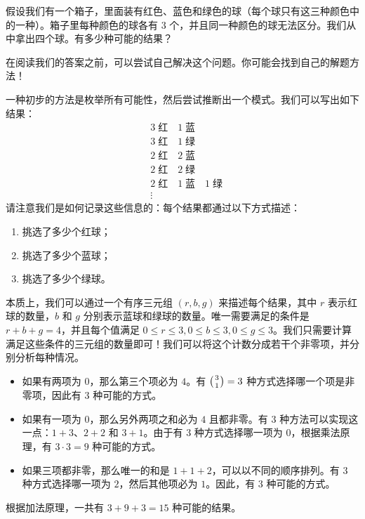 \begin{example}
    假设我们有一个箱子，里面装有红色、蓝色和绿色的球（每个球只有这三种颜色中的一种）。箱子里每种颜色的球各有 $3$ 个，并且同一种颜色的球无法区分。我们从中拿出四个球。有多少种可能的结果？

    在阅读我们的答案之前，可以尝试自己解决这个问题。你可能会找到自己的解题方法！

    一种初步的方法是枚举所有可能性，然后尝试推断出一个模式。我们可以写出如下结果：
    \begin{align*}
         & 3 \;\text{红} \quad 1 \;\text{蓝}                    \\
         & 3 \;\text{红} \quad 1 \;\text{绿}                    \\
         & 2 \;\text{红} \quad 2 \;\text{蓝}                    \\
         & 2 \;\text{红} \quad 2 \;\text{绿}                    \\
         & 2 \;\text{红} \quad 1 \;\text{蓝} \quad 1 \;\text{绿} \\
         & \vdots
    \end{align*}
    请注意我们是如何记录这些信息的：每个结果都通过以下方式描述：
    \begin{enumerate}[label=(\alph*)]
        \item 挑选了多少个红球；
        \item 挑选了多少个蓝球；
        \item 挑选了多少个绿球。
    \end{enumerate}
    本质上，我们可以通过一个有序三元组 $(r, b, g)$ 来描述每个结果，其中 $r$ 表示红球的数量，$b$ 和 $g$ 分别表示蓝球和绿球的数量。唯一需要满足的条件是 $r+b+g=4$，并且每个值满足 $0 \le r \le 3, 0 \le b \le 3, 0 \le g \le 3$。我们只需要计算满足这些条件的三元组的数量即可！我们可以将这个计数分成若干个非零项，并分别分析每种情况。
    \begin{itemize}
        \item 如果有两项为 $0$，那么第三个项必为 $4$。有 $\big({3 \atop 1}\big)=3$ 种方式选择哪一个项是非零项，因此有 $3$ 种可能的方式。
        \item 如果有一项为 $0$，那么另外两项之和必为 $4$ 且都非零。有 $3$ 种方法可以实现这一点：$1 + 3$、$2 + 2$ 和 $3 + 1$。由于有 $3$ 种方式选择哪一项为 $0$，根据乘法原理，有 $3 \cdot 3 = 9$ 种可能的方式。
        \item 如果三项都非零，那么唯一的和是 $1 + 1 + 2$，可以以不同的顺序排列。有 $3$ 种方式选择哪一项为 $2$，然后其他项必为 $1$。因此，有 $3$ 种可能的方式。
    \end{itemize}
    根据加法原理，一共有 $3 + 9 + 3 = 15$ 种可能的结果。
\end{example}

